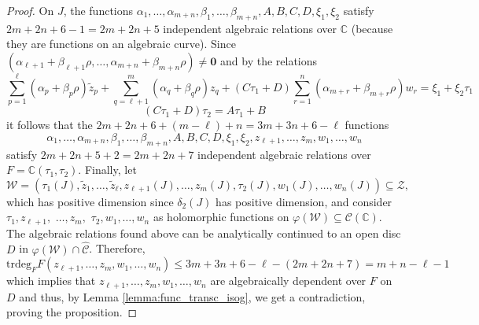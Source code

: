 \documentclass[11pt,a4paper,reqno]{amsart}
\numberwithin{equation}{section}
\newcommand{\C}{\mathbb{C}}
\renewcommand{\c}{\mathcal{C}}
\renewcommand{\a}{\alpha}
\renewcommand{\b}{\beta}
\renewcommand{\d}{\delta}
\newcommand{\f}{\varphi}
\renewcommand{\r}{\rho}
\newcommand{\pt}[1]{\left( #1 \right)}
\theoremstyle{remark}
\theoremstyle{definition}
\theoremstyle{definition}
\begin{document}
\begin{proof}
On $J$, the functions $\a_{1}, \ldots, \a_{m+n},\b_{1}, \ldots, \b_{m+n}, A,B,C,D, \xi_1, \xi_2$ satisfy $2m+2n+6-1=2m+2n+5$ independent algebraic relations over $\C$ (because they are functions on an algebraic curve). Since $\pt{\a_{\ell+1} + \b_{\ell+1} \r, \ldots, \a_{m+n} + \b_{m+n} \r}\neq \mathbf{0}$ and by the relations 
$$\sum\limits_{p=1}^{\ell}(\a_p+\b_p \r)\widetilde{z}_p + \sum\limits_{q=\ell+1}^{m}(\a_q+\b_q \r)z_q+\pt{C\tau_1+D}\sum\limits_{r=1}^{n}(\a_{m+r}+\b_{m+r}\r)w_r=\xi_1+\xi_2\tau_1 $$
$$\pt{C\tau_1+D}\tau_2=A\tau_1+B$$ 
it follows that the $2m+2n+6+(m-\ell)+n=3m+3n+6- \ell$ functions 
$$\a_{1}, \ldots, \a_{m+n},\b_{1}, \ldots, \b_{m+n}, A,B,C,D, \xi_1, \xi_2, z_{\ell+1}, \ldots, z_m, w_1, \ldots, w_n$$ satisfy $2m+2n+5+2=2m+2n+7$ independent algebraic relations over $F=\C\pt{\tau_1, \tau_2}$. Finally, let
$$\mathcal{W}=(\tau_1(J), \widetilde{z}_1,\ldots,\widetilde{z}_{\ell}, z_{\ell+1}(J), \ldots , z_m(J), \tau_2(J), w_1(J), \ldots, w_n(J)) \subseteq \mathcal{Z},$$
which has positive dimension since $\d_2(J)$ has positive dimension, and consider $\tau_1, z_{\ell+1},$ $\ldots , z_m,$ $\tau_2, w_1, \ldots, w_n$ as holomorphic functions on $\f(\mathcal{W}) \subseteq \c(\C)$. The algebraic relations found above can be analytically continued to an open disc $D$ in $\f(\mathcal{W}) \cap \widehat{\c}$. Therefore, 
$$\mathrm{trdeg}_F F\pt{z_{\ell+1}, \ldots, z_m, w_1, \ldots, w_n} \leq 3m+3n+6 - \ell-(2m+2n+7)=m+n-\ell-1$$
which implies that $z_{\ell+1}, \ldots, z_m, w_1, \ldots, w_n$ are algebraically dependent over $F$ on $D$ and thus, by Lemma \ref{lemma:func_transc_isog}, we get a contradiction, proving the proposition.
\end{proof}
\end{document}
